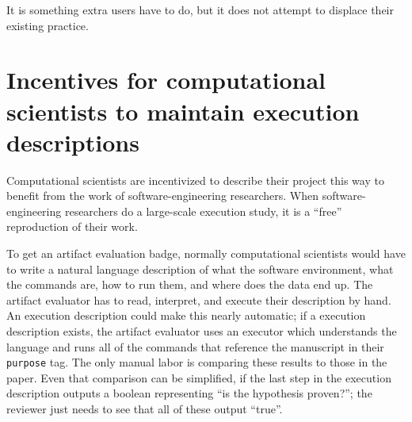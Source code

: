 \documentclass[manuscript,authordraft]{acmart}
\begin{document}
It is something extra users have to do, but it does not attempt to
displace their existing practice.

\hypertarget{incentives-for-computational-scientists-to-maintain-execution-descriptions}{%
\section{Incentives for computational scientists to maintain execution
descriptions}\label{incentives-for-computational-scientists-to-maintain-execution-descriptions}}

Computational scientists are incentivized to describe their project this
way to benefit from the work of software-engineering researchers. When
software-engineering researchers do a large-scale execution study, it is
a ``free'' reproduction of their work.

To get an artifact evaluation badge, normally computational scientists
would have to write a natural language description of what the software
environment, what the commands are, how to run them, and where does the
data end up. The artifact evaluator has to read, interpret, and execute
their description by hand. An execution description could make this
nearly automatic; if a execution description exists, the artifact
evaluator uses an executor which understands the language and runs all
of the commands that reference the manuscript in their \texttt{purpose}
tag. The only manual labor is comparing these results to those in the
paper. Even that comparison can be simplified, if the last step in the
execution description outputs a boolean representing ``is the hypothesis
proven?''; the reviewer just needs to see that all of these output
``true''.



%


\end{document}

